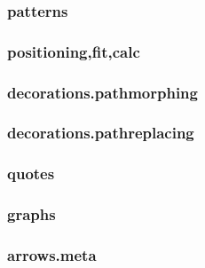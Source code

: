 \subsubsection{patterns}
\subsubsection{positioning,fit,calc}
\subsubsection{decorations.pathmorphing}
\subsubsection{decorations.pathreplacing}
\subsubsection{quotes}
\subsubsection{graphs}
\subsubsection{arrows.meta}





